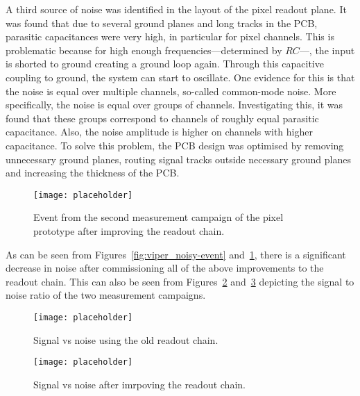 A third source of noise was identified in the layout of the pixel readout plane.
It was found that due to several ground planes and long tracks in the PCB, parasitic capacitances were very high, in particular for pixel channels.
This is problematic because for high enough frequencies---determined by $RC$---, the input is shorted to ground creating a ground loop again.
Through this capacitive coupling to ground, the system can start to oscillate.
One evidence for this is that the noise is equal over multiple channels, so-called common-mode noise.
More specifically, the noise is equal over groups of channels.
Investigating this, it was found that these groups correspond to channels of roughly equal parasitic capacitance.
Also, the noise amplitude is higher on channels with higher capacitance.
To solve this problem, the PCB design was optimised by removing unnecessary ground planes, routing signal tracks outside necessary ground planes and increasing the thickness of the PCB.

\begin{figure}[htb] %
	\centering
	\texttt{[image: placeholder]}
	\caption{Event from the second measurement campaign of the pixel prototype after improving the readout chain.}
	\label{fig:viper_good-event}
\end{figure}

As can be seen from Figures~\ref{fig:viper_noisy-event} and~\ref{fig:viper_good-event}, there is a significant decrease in noise after commissioning all of the above improvements to the readout chain.
This can also be seen from Figures~\ref{fig:viper_snr-noisy} and~\ref{fig:viper_snr-good} depicting the signal to noise ratio of the two measurement campaigns.

\begin{figure}[htb] %
	\centering
	\texttt{[image: placeholder]}
	\caption{Signal vs noise using the old readout chain.}
	\label{fig:viper_snr-noisy}
\end{figure}

\begin{figure}[htb] %
	\centering
	\texttt{[image: placeholder]}
	\caption{Signal vs noise after imrpoving the readout chain.}
	\label{fig:viper_snr-good}
\end{figure}